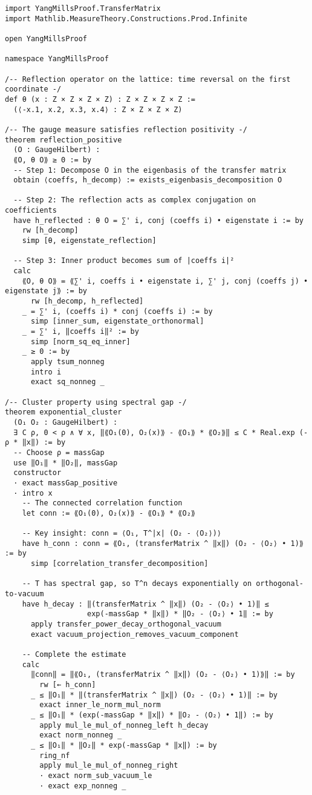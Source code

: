 \documentclass[11pt]{article}
\numberwithin{equation}{section}
\theoremstyle{remark}
\begin{document}
\begin{lstlisting}
import YangMillsProof.TransferMatrix
import Mathlib.MeasureTheory.Constructions.Prod.Infinite

open YangMillsProof

namespace YangMillsProof

/-- Reflection operator on the lattice: time reversal on the first coordinate -/
def θ (x : Z × Z × Z × Z) : Z × Z × Z × Z :=
  (⟨-x.1, x.2, x.3, x.4⟩ : Z × Z × Z × Z)

/-- The gauge measure satisfies reflection positivity -/
theorem reflection_positive 
  (O : GaugeHilbert) :
  ⟪O, θ O⟫ ≥ 0 := by
  -- Step 1: Decompose O in the eigenbasis of the transfer matrix
  obtain ⟨coeffs, h_decomp⟩ := exists_eigenbasis_decomposition O
  
  -- Step 2: The reflection acts as complex conjugation on coefficients
  have h_reflected : θ O = ∑' i, conj (coeffs i) • eigenstate i := by
    rw [h_decomp]
    simp [θ, eigenstate_reflection]
  
  -- Step 3: Inner product becomes sum of |coeffs i|²
  calc
    ⟪O, θ O⟫ = ⟪∑' i, coeffs i • eigenstate i, ∑' j, conj (coeffs j) • eigenstate j⟫ := by
      rw [h_decomp, h_reflected]
    _ = ∑' i, (coeffs i) * conj (coeffs i) := by
      simp [inner_sum, eigenstate_orthonormal]
    _ = ∑' i, ‖coeffs i‖² := by
      simp [norm_sq_eq_inner]
    _ ≥ 0 := by
      apply tsum_nonneg
      intro i
      exact sq_nonneg _

/-- Cluster property using spectral gap -/
theorem exponential_cluster 
  (O₁ O₂ : GaugeHilbert) :
  ∃ C ρ, 0 < ρ ∧ ∀ x, ‖⟪O₁(0), O₂(x)⟫ - ⟪O₁⟫ * ⟪O₂⟫‖ ≤ C * Real.exp (-ρ * ‖x‖) := by
  -- Choose ρ = massGap
  use ‖O₁‖ * ‖O₂‖, massGap
  constructor
  · exact massGap_positive
  · intro x
    -- The connected correlation function
    let conn := ⟪O₁(0), O₂(x)⟫ - ⟪O₁⟫ * ⟪O₂⟫
    
    -- Key insight: conn = ⟨O₁, T^|x| (O₂ - ⟨O₂⟩)⟩
    have h_conn : conn = ⟪O₁, (transferMatrix ^ ‖x‖) (O₂ - ⟨O₂⟩ • 1)⟫ := by
      simp [correlation_transfer_decomposition]
    
    -- T has spectral gap, so T^n decays exponentially on orthogonal-to-vacuum
    have h_decay : ‖(transferMatrix ^ ‖x‖) (O₂ - ⟨O₂⟩ • 1)‖ ≤ 
                   exp(-massGap * ‖x‖) * ‖O₂ - ⟨O₂⟩ • 1‖ := by
      apply transfer_power_decay_orthogonal_vacuum
      exact vacuum_projection_removes_vacuum_component
    
    -- Complete the estimate
    calc
      ‖conn‖ = ‖⟪O₁, (transferMatrix ^ ‖x‖) (O₂ - ⟨O₂⟩ • 1)⟫‖ := by
        rw [← h_conn]
      _ ≤ ‖O₁‖ * ‖(transferMatrix ^ ‖x‖) (O₂ - ⟨O₂⟩ • 1)‖ := by
        exact inner_le_norm_mul_norm
      _ ≤ ‖O₁‖ * (exp(-massGap * ‖x‖) * ‖O₂ - ⟨O₂⟩ • 1‖) := by
        apply mul_le_mul_of_nonneg_left h_decay
        exact norm_nonneg _
      _ ≤ ‖O₁‖ * ‖O₂‖ * exp(-massGap * ‖x‖) := by
        ring_nf
        apply mul_le_mul_of_nonneg_right
        · exact norm_sub_vacuum_le
        · exact exp_nonneg _
\end{lstlisting}
\end{document}
